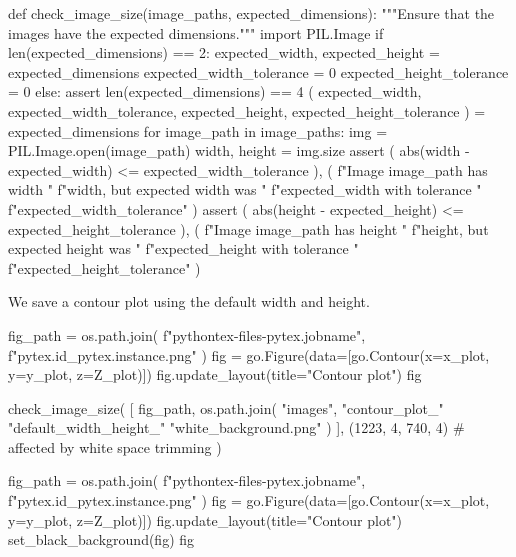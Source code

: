 \documentclass[oneside]{book}
\begin{document}
\begin{pycell}
def check_image_size(image_paths, expected_dimensions):
    """Ensure that the images have the expected dimensions."""
    import PIL.Image
    if len(expected_dimensions) == 2:
        expected_width, expected_height = expected_dimensions
        expected_width_tolerance = 0
        expected_height_tolerance = 0
    else:
        assert len(expected_dimensions) == 4
        (
            expected_width, expected_width_tolerance,
            expected_height, expected_height_tolerance
        ) = expected_dimensions
    for image_path in image_paths:
        img = PIL.Image.open(image_path)
        width, height = img.size
        assert (
            abs(width - expected_width)
            <= expected_width_tolerance
        ), (
            f"Image {image_path} has width "
            f"{width}, but expected width was "
            f"{expected_width} with tolerance "
            f"{expected_width_tolerance}"
        )
        assert (
            abs(height - expected_height)
            <= expected_height_tolerance
        ), (
            f"Image {image_path} has height "
            f"{height}, but expected height was "
            f"{expected_height} with tolerance "
            f"{expected_height_tolerance}"
        )
\end{pycell}

\begin{mdcell}
We save a contour plot using the default width and height.
\end{mdcell}

\begin{pycell}
fig_path = os.path.join(
    f"pythontex-files-{pytex.jobname}",
    f"{pytex.id}_{pytex.instance}.png"
)
fig = go.Figure(data=[go.Contour(x=x_plot, y=y_plot, z=Z_plot)])
fig.update_layout(title="Contour plot")
fig
\end{pycell}

\begin{pycell}
check_image_size(
    [
        fig_path,
        os.path.join(
            "images",
            "contour_plot_"
            "default_width_height_"
            "white_background.png"
        )
    ],
    (1223, 4, 740, 4)  # affected by white space trimming
)
\end{pycell}

\begin{pycell}
fig_path = os.path.join(
    f"pythontex-files-{pytex.jobname}",
    f"{pytex.id}_{pytex.instance}.png"
)
fig = go.Figure(data=[go.Contour(x=x_plot, y=y_plot, z=Z_plot)])
fig.update_layout(title="Contour plot")
set_black_background(fig)
fig
\end{pycell}
\end{document}
